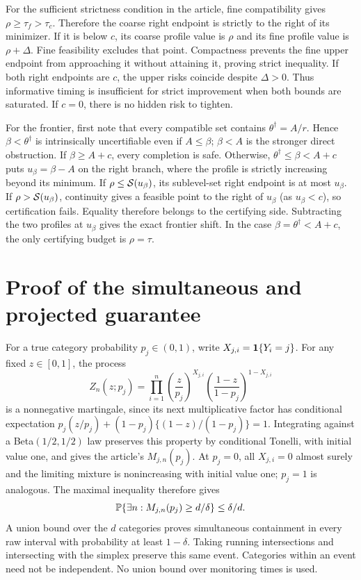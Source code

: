 \documentclass[10pt]{article}
\begin{document}
For the sufficient strictness condition in the article, fine compatibility gives $\rho\ge\tau_f>\tau_c$. Therefore the coarse right endpoint is strictly to the right of its minimizer. If it is below $c$, its coarse profile value is $\rho$ and its fine profile value is $\rho+\Delta$. Fine feasibility excludes that point. Compactness prevents the fine upper endpoint from approaching it without attaining it, proving strict inequality. If both right endpoints are $c$, the upper risks coincide despite $\Delta>0$. Thus informative timing is insufficient for strict improvement when both bounds are saturated. If $c=0$, there is no hidden risk to tighten.

For the frontier, first note that every compatible set contains $\theta^\dagger=A/r$. Hence $\beta<\theta^\dagger$ is intrinsically uncertifiable even if $A\le\beta$; $\beta<A$ is the stronger direct obstruction. If $\beta\ge A+c$, every completion is safe. Otherwise, $\theta^\dagger\le\beta<A+c$ puts $u_\beta=\beta-A$ on the right branch, where the profile is strictly increasing beyond its minimum. If $\rho\le\mathcal S(u_\beta)$, its sublevel-set right endpoint is at most $u_\beta$. If $\rho>\mathcal S(u_\beta)$, continuity gives a feasible point to the right of $u_\beta$ (as $u_\beta<c$), so certification fails. Equality therefore belongs to the certifying side. Subtracting the two profiles at $u_\beta$ gives the exact frontier shift. In the case $\beta=\theta^\dagger<A+c$, the only certifying budget is $\rho=\tau$.

\section{Proof of the simultaneous and projected guarantee}
For a true category probability $p_j\in(0,1)$, write $X_{j,i}=\mathbf 1\{Y_i=j\}$. For any fixed $z\in[0,1]$, the process
\begin{equation}
 Z_n(z;p_j)=\prod_{i=1}^n
 \left(\frac z{p_j}\right)^{X_{j,i}}
 \left(\frac{1-z}{1-p_j}\right)^{1-X_{j,i}}
\end{equation}
is a nonnegative martingale, since its next multiplicative factor has conditional expectation $p_j(z/p_j)+(1-p_j)\{(1-z)/(1-p_j)\}=1$. Integrating against a Beta$(1/2,1/2)$ law preserves this property by conditional Tonelli, with initial value one, and gives the article's $M_{j,n}(p_j)$. At $p_j=0$, all $X_{j,i}=0$ almost surely and the limiting mixture is nonincreasing with initial value one; $p_j=1$ is analogous. The maximal inequality therefore gives
\begin{equation}
 \mathbb P\{\exists n:M_{j,n}(p_j)\ge d/\delta\}\le\delta/d.
\end{equation}
A union bound over the $d$ categories proves simultaneous containment in every raw interval with probability at least $1-\delta$. Taking running intersections and intersecting with the simplex preserve this same event. Categories within an event need not be independent. No union bound over monitoring times is used.
\end{document}
